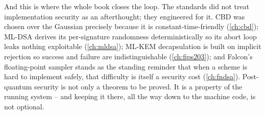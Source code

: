 And this is where the whole book closes the loop. The standards did not treat
implementation security as an afterthought; they engineered for it. CBD was chosen
over the Gaussian precisely because it is constant-time-friendly (\ref{ch:cbd});
ML-DSA derives its per-signature randomness deterministically so its abort loop leaks
nothing exploitable (\ref{ch:mldsa}); ML-KEM decapsulation is built on implicit
rejection so success and failure are indistinguishable (\ref{ch:fips203}); and
Falcon's floating-point sampler stands as the standing reminder that when a scheme is
hard to implement safely, that difficulty is itself a security cost (\ref{ch:fndsa}).
Post-quantum security is not only a theorem to be proved. It is a property of the
running system -- and keeping it there, all the way down to the machine code, is not
optional.
